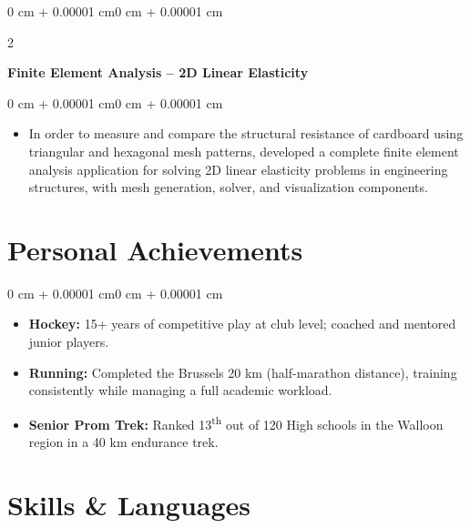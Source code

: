 \documentclass[10pt, letterpaper]{article}
\newenvironment{highlights}{
    \begin{itemize}[
        topsep=0.06 cm,
        parsep=0.06 cm,
        partopsep=0pt,
        itemsep=0pt,
        leftmargin=0 cm + 10pt
    ]
}{
    \end{itemize}
}
\newenvironment{highlightsforbulletentries}{
    \begin{itemize}[
        topsep=0.06 cm,
        parsep=0.06 cm,
        partopsep=0pt,
        itemsep=0pt,
        leftmargin=10pt
    ]
}{
    \end{itemize}
}
\newenvironment{onecolentry}{
    \begin{adjustwidth}{0 cm + 0.00001 cm}{0 cm + 0.00001 cm}
}{
    \end{adjustwidth}
}
\newenvironment{twocolentry}[2][]{
    \onecolentry
    \def\secondColumn{#2}
    \setcolumnwidth{\fill, 4.5 cm}
    \begin{paracol}{2}
}{
    \switchcolumn \raggedleft \secondColumn
    \end{paracol}
    \endonecolentry
}
\begin{document}
        \begin{twocolentry}{}
            \textbf{Finite Element Analysis -- 2D Linear Elasticity}
        \end{twocolentry}
        \vspace{0.06 cm}
        \begin{onecolentry}
            \begin{highlights}
                \item In order to measure and compare the structural resistance of cardboard using triangular and hexagonal mesh patterns, developed a complete finite element analysis application for solving 2D linear elasticity problems in engineering structures, with mesh generation, solver, and visualization components.

            \end{highlights}
        \end{onecolentry}

    \section{Personal Achievements}

        \begin{onecolentry}
            \begin{highlightsforbulletentries}
                \item \textbf{Hockey:} 15+ years of competitive play at club level; coached and mentored junior players.
                \item \textbf{Running:} Completed the Brussels 20 km (half-marathon distance), training consistently while managing a full academic workload.
                \item \textbf{Senior Prom Trek:} Ranked 13\textsuperscript{th} out of 120 High schools in the Walloon region in a 40 km endurance trek.
            \end{highlightsforbulletentries}
        \end{onecolentry}

    \section{Skills \& Languages}
\end{document}

